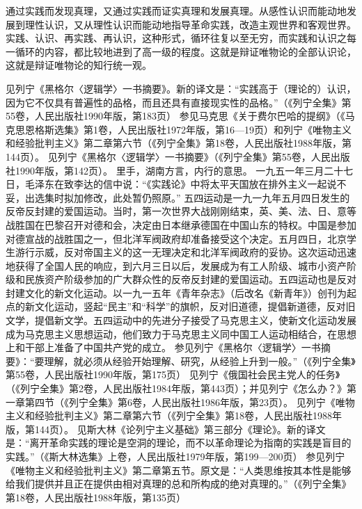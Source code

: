 通过实践而发现真理，又通过实践而证实真理和发展真理。从感性认识而能动地发展到理性认识，又从理性认识而能动地指导革命实践，改造主观世界和客观世界。实践、认识、再实践、再认识，这种形式，循环往复以至无穷，而实践和认识之每一循环的内容，都比较地进到了高一级的程度。这就是辩证唯物论的全部认识论，这就是辩证唯物论的知行统一观。


\begin{maonote}
见列宁《黑格尔〈逻辑学〉一书摘要》。新的译文是：“实践高于（理论的）认识，因为它不仅具有普遍性的品格，而且还具有直接现实性的品格。”（《列宁全集》第55卷，人民出版社1990年版，第183页）
参见马克思《关于费尔巴哈的提纲》（《马克思恩格斯选集》第1卷，人民出版社1972年版，第16—19页）和列宁《唯物主义和经验批判主义》第二章第六节（《列宁全集》第18卷，人民出版社1988年版，第144页）。
见列宁《黑格尔〈逻辑学〉一书摘要》（《列宁全集》第55卷，人民出版社1990年版，第142页）。
里手，湖南方言，内行的意思。
一九五一年三月二十七日，毛泽东在致李达的信中说：“《实践论》中将太平天国放在排外主义一起说不妥，出选集时拟加修改，此处暂仍照原。”
五四运动是一九一九年五月四日发生的反帝反封建的爱国运动。当时，第一次世界大战刚刚结束，英、美、法、日、意等战胜国在巴黎召开对德和会，决定由日本继承德国在中国山东的特权。中国是参加对德宣战的战胜国之一，但北洋军阀政府却准备接受这个决定。五月四日，北京学生游行示威，反对帝国主义的这一无理决定和北洋军阀政府的妥协。这次运动迅速地获得了全国人民的响应，到六月三日以后，发展成为有工人阶级、城市小资产阶级和民族资产阶级参加的广大群众性的反帝反封建的爱国运动。五四运动也是反对封建文化的新文化运动。以一九一五年《青年杂志》（后改名《新青年》）创刊为起点的新文化运动，竖起“民主”和“科学”的旗帜，反对旧道德，提倡新道德，反对旧文学，提倡新文学。五四运动中的先进分子接受了马克思主义，使新文化运动发展成为马克思主义思想运动，他们致力于马克思主义同中国工人运动相结合，在思想上和干部上准备了中国共产党的成立。
参见列宁《黑格尔〈逻辑学〉一书摘要》：“要理解，就必须从经验开始理解、研究，从经验上升到一般。”（《列宁全集》第55卷，人民出版社1990年版，第175页）
见列宁《俄国社会民主党人的任务》（《列宁全集》第2卷，人民出版社1984年版，第443页）；并见列宁《怎么办？》第一章第四节（《列宁全集》第6卷，人民出版社1986年版，第23页）。
见列宁《唯物主义和经验批判主义》第二章第六节（《列宁全集》第18卷，人民出版社1988年版，第144页）。
见斯大林《论列宁主义基础》第三部分《理论》。新的译文是：“离开革命实践的理论是空洞的理论，而不以革命理论为指南的实践是盲目的实践。”（《斯大林选集》上卷，人民出版社1979年版，第199—200页）
参见列宁《唯物主义和经验批判主义》第二章第五节。原文是：“人类思维按其本性是能够给我们提供并且正在提供由相对真理的总和所构成的绝对真理的。”（《列宁全集》第18卷，人民出版社1988年版，第135页）
\end{maonote}
